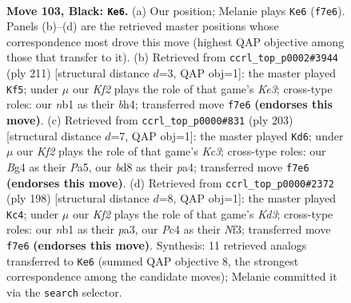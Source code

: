 \documentclass[11pt]{article}
\begin{document}
\clearpage

\begin{figure}[p]\centering
\begin{subfigure}{0.46\textwidth}\centering
\resizebox{\linewidth}{!}{%
\newchessgame
\chessboard[
  setfen={3B4/5k2/8/8/p1p3b1/8/5K2/1N6 b - - 61 103},
  showmover=false,
  pgfstyle=straightmove, color=movearrow, markmove={f7-e6}
]}
\caption{}
\end{subfigure}\hfill
\begin{subfigure}{0.46\textwidth}\centering
\resizebox{\linewidth}{!}{%
\newchessgame
\chessboard[
  setfen={8/1b6/4k3/7p/5p1B/8/8/6K1 b - - 59 106},
  showmover=false,
  pgfstyle=straightmove, color=movearrow, markmove={e6-f5}
]}
\caption{}
\end{subfigure}
\\[4pt]
\begin{subfigure}{0.46\textwidth}\centering
\resizebox{\linewidth}{!}{%
\newchessgame
\chessboard[
  setfen={8/8/2k5/p7/P1K5/8/4p1N1/8 b - - 71 102},
  showmover=false,
  pgfstyle=straightmove, color=movearrow, markmove={c6-d6}
]}
\caption{}
\end{subfigure}\hfill
\begin{subfigure}{0.46\textwidth}\centering
\resizebox{\linewidth}{!}{%
\newchessgame
\chessboard[
  setfen={7b/8/8/k7/8/p2K1N2/P7/8 w - - 56 100},
  showmover=false,
  pgfstyle=straightmove, color=movearrow, markmove={d3-c4}
]}
\caption{}
\end{subfigure}
\caption{\textbf{Move 103, Black: \texttt{Ke6}.} (a) Our position; Melanie plays \texttt{Ke6} (\texttt{f7e6}). Panels (b)--(d) are the retrieved master positions whose correspondence most drove this move (highest QAP objective among those that transfer to it). (b) Retrieved from \texttt{ccrl\_top\_p0002\#3944} (ply 211) [structural distance $d$=3, QAP obj=1]: the master played \texttt{Kf5}; under $\mu$ our \emph{Kf2} plays the role of that game's \emph{Ke3}; cross-type roles: our \emph{n}b1 as their \emph{b}h4; transferred move \texttt{f7e6} \textbf{(endorses this move)}. (c) Retrieved from \texttt{ccrl\_top\_p0000\#831} (ply 203) [structural distance $d$=7, QAP obj=1]: the master played \texttt{Kd6}; under $\mu$ our \emph{Kf2} plays the role of that game's \emph{Kc3}; cross-type roles: our \emph{B}g4 as their \emph{P}a5, our \emph{b}d8 as their \emph{p}a4; transferred move \texttt{f7e6} \textbf{(endorses this move)}. (d) Retrieved from \texttt{ccrl\_top\_p0000\#2372} (ply 198) [structural distance $d$=8, QAP obj=1]: the master played \texttt{Kc4}; under $\mu$ our \emph{Kf2} plays the role of that game's \emph{Kd3}; cross-type roles: our \emph{n}b1 as their \emph{p}a3, our \emph{P}c4 as their \emph{N}f3; transferred move \texttt{f7e6} \textbf{(endorses this move)}. Synthesis: 11 retrieved analogs transferred to \texttt{Ke6} (summed QAP objective 8, the strongest correspondence among the candidate moves); Melanie committed it via the \texttt{search} selector.}
\label{fig:thought-m205}
\end{figure}
\end{document}
